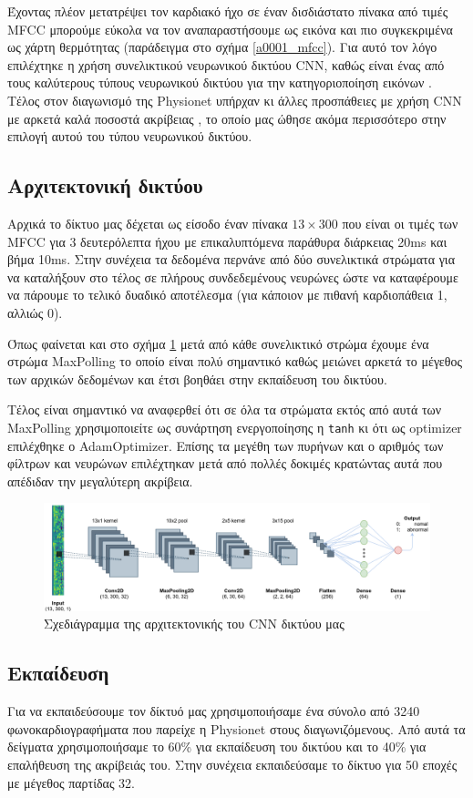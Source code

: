 \documentclass[../main.tex]{subfiles}
\begin{document}
Έχοντας πλέον μετατρέψει τον καρδιακό ήχο σε έναν δισδιάστατο πίνακα από τιμές
MFCC μπορούμε εύκολα να τον αναπαραστήσουμε ως εικόνα και πιο συγκεκριμένα ως
χάρτη θερμότητας (παράδειγμα στο σχήμα \ref{a0001_mfcc}). Για αυτό τον λόγο
επιλέχτηκε η χρήση συνελικτικού νευρωνικού δικτύου CNN, καθώς είναι ένας από
τους καλύτερους τύπους νευρωνικού δικτύου για την κατηγοριοποίηση εικόνων
\cite{ramprasath2018image}. Τέλος στον διαγωνισμό της Physionet \cite{physionet}
υπήρχαν κι άλλες προσπάθειες με χρήση CNN με αρκετά καλά ποσοστά ακρίβειας
\cite{jrubin}, το οποίο μας ώθησε ακόμα περισσότερο στην επιλογή αυτού του τύπου
νευρωνικού δικτύου.

\subsection{Αρχιτεκτονική δικτύου}

Αρχικά το δίκτυο μας δέχεται ως είσοδο έναν πίνακα $13\times300$ που είναι οι
τιμές των MFCC για 3 δευτερόλεπτα ήχου με επικαλυπτόμενα παράθυρα διάρκειας 20ms
και βήμα 10ms. Στην συνέχεια τα δεδομένα περνάνε από δύο συνελικτικά στρώματα
για να καταλήξουν στο τέλος σε πλήρους συνδεδεμένους νευρώνες ώστε να
καταφέρουμε να πάρουμε το τελικό δυαδικό αποτέλεσμα (για κάποιον με πιθανή
καρδιοπάθεια 1, αλλιώς 0).

Όπως φαίνεται και στο σχήμα \ref{cnn} μετά από κάθε συνελικτικό στρώμα έχουμε
ένα στρώμα MaxPolling το οποίο είναι πολύ σημαντικό καθώς μειώνει αρκετά το
μέγεθος των αρχικών δεδομένων και έτσι βοηθάει στην εκπαίδευση του δικτύου.

Τέλος είναι σημαντικό να αναφερθεί ότι σε όλα τα στρώματα εκτός από αυτά των
MaxPolling χρησιμοποιείτε ως συνάρτηση ενεργοποίησης η \verb|tanh| κι ότι ως
optimizer επιλέχθηκε ο AdamOptimizer. Επίσης τα μεγέθη των πυρήνων και ο αριθμός
των φίλτρων και νευρώνων επιλέχτηκαν μετά από πολλές δοκιμές κρατώντας αυτά που
απέδιδαν την μεγαλύτερη ακρίβεια.

\begin{figure}[H]
	\includegraphics[width=\textwidth]{../images/cnn.png}
	\caption{Σχεδιάγραμμα της αρχιτεκτονικής του CNN δικτύου μας}
	\label{cnn}
\end{figure}


\subsection{Εκπαίδευση}

Για να εκπαιδεύσουμε τον δίκτυό μας χρησιμοποιήσαμε ένα σύνολο από 3240
φωνοκαρδιογραφήματα που παρείχε η Physionet \cite{physionet} στους
διαγωνιζόμενους. Από αυτά τα δείγματα χρησιμοποιήσαμε το 60\% για εκπαίδευση του
δικτύου και το 40\% για επαλήθευση της ακρίβειάς του. Στην συνέχεια εκπαιδεύσαμε
το δίκτυο για 50 εποχές με μέγεθος παρτίδας 32.
\end{document}
